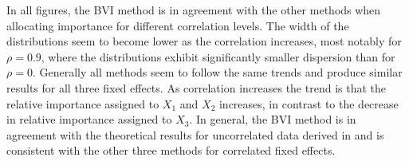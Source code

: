 In all figures, the BVI method is in agreement with the other methods when allocating importance for different correlation levels.
The width of the distributions seem to become lower as the correlation increases, most notably for $\rho=0.9$, where the distributions exhibit significantly smaller dispersion than for $\rho=0$.
Generally all methods seem to follow the same trends and produce similar results for all three fixed effects. 
As correlation increases the trend is that the relative importance assigned to $X_1$ and $X_2$ increases, in contrast to the decrease in relative importance assigned to $X_3$.
\newline
\newline
In general, the BVI method is in agreement with the theoretical results for uncorrelated data derived in  and is consistent with the other three methods for correlated fixed effects. 
